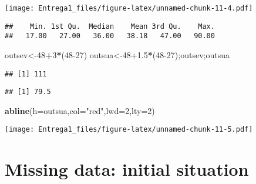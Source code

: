 \documentclass[12pt,]{article}
\newenvironment{Shaded}{\begin{snugshade}}{\end{snugshade}}
\newcommand{\CommentTok}[1]{\textcolor[rgb]{0.56,0.35,0.01}{\textit{#1}}}
\newcommand{\DataTypeTok}[1]{\textcolor[rgb]{0.13,0.29,0.53}{#1}}
\newcommand{\DecValTok}[1]{\textcolor[rgb]{0.00,0.00,0.81}{#1}}
\newcommand{\FloatTok}[1]{\textcolor[rgb]{0.00,0.00,0.81}{#1}}
\newcommand{\KeywordTok}[1]{\textcolor[rgb]{0.13,0.29,0.53}{\textbf{#1}}}
\newcommand{\NormalTok}[1]{#1}
\newcommand{\OperatorTok}[1]{\textcolor[rgb]{0.81,0.36,0.00}{\textbf{#1}}}
\newcommand{\StringTok}[1]{\textcolor[rgb]{0.31,0.60,0.02}{#1}}
\begin{document}
\texttt{[image: Entrega1\_files/figure-latex/unnamed-chunk-11-4.pdf]}

\begin{Shaded}
\end{Shaded}

\begin{verbatim}
##    Min. 1st Qu.  Median    Mean 3rd Qu.    Max. 
##   17.00   27.00   36.00   38.18   47.00   90.00
\end{verbatim}

\begin{Shaded}
\begin{Highlighting}[]
\NormalTok{outsev<-}\DecValTok{48}\OperatorTok{+}\DecValTok{3}\OperatorTok{*}\NormalTok{(}\DecValTok{48-27}\NormalTok{)}
\NormalTok{outsua<-}\DecValTok{48}\FloatTok{+1.5}\OperatorTok{*}\NormalTok{(}\DecValTok{48-27}\NormalTok{);outsev;outsua}
\end{Highlighting}
\end{Shaded}

\begin{verbatim}
## [1] 111
\end{verbatim}

\begin{verbatim}
## [1] 79.5
\end{verbatim}

\begin{Shaded}
\begin{Highlighting}[]
\KeywordTok{abline}\NormalTok{(}\DataTypeTok{h=}\NormalTok{outsua,}\DataTypeTok{col=}\StringTok{"red"}\NormalTok{,}\DataTypeTok{lwd=}\DecValTok{2}\NormalTok{,}\DataTypeTok{lty=}\DecValTok{2}\NormalTok{)}
\end{Highlighting}
\end{Shaded}

\texttt{[image: Entrega1\_files/figure-latex/unnamed-chunk-11-5.pdf]}

\hypertarget{missing-data-initial-situation}{%
\section{Missing data: initial
situation}\label{missing-data-initial-situation}}
\end{document}
